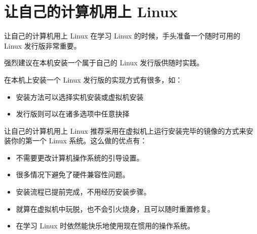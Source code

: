 \documentclass[UTF8]{ctexbeamer}
\begin{document}
\section{让自己的计算机用上 Linux}
\begin{frame}{让自己的计算机用上 Linux}
    在学习 Linux 的时候，手头准备一个随时可用的 Linux 发行版非常重要。

    强烈建议在本机安装一个属于自己的 Linux 发行版供随时实践。

    在本机上安装一个 Linux 发行版的实现方式有很多，如：
    \begin{itemize}
        \item 安装方法可以选择实机安装或虚拟机安装
        \item 发行版则可以在诸多选项中任意抉择
    \end{itemize}
\end{frame}
\begin{frame}{让自己的计算机用上 Linux}
    推荐采用在虚拟机上运行安装完毕的镜像的方式来安装你的第一个 Linux 系统。这么做的优点有：
    \begin{itemize}
        \item 不需要更改计算机操作系统的引导设置。
        \item 很多情况下避免了硬件兼容性问题。
        \item 安装流程已提前完成，不用经历安装步骤。
        \item 就算在虚拟机中玩脱，也不会引火烧身，且可以随时重置修复。
        \item 在学习 Linux 时依然能快乐地使用现在惯用的操作系统。
    \end{itemize}
\end{frame}
\end{document}
